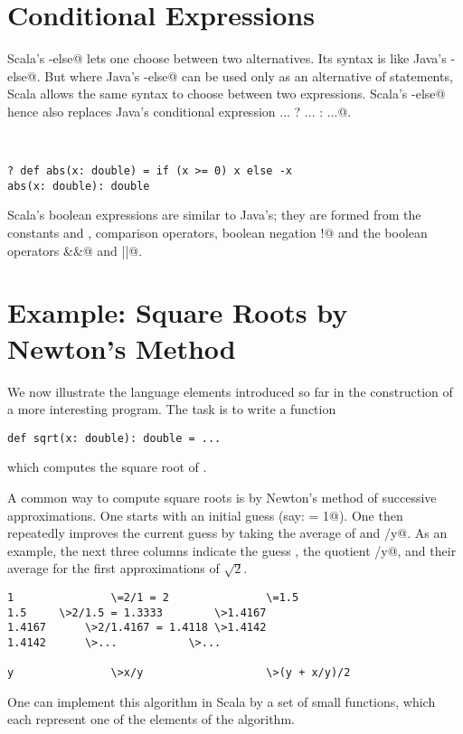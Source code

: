 \documentclass[11pt]{book}
\begin{document}
\section{Conditional Expressions}

Scala's \verb@if-else@ lets one choose between two alternatives.  Its
syntax is like Java's \verb@if-else@. But where Java's \verb@if-else@
can be used only as an alternative of statements, Scala allows the
same syntax to choose between two expressions. Scala's \verb@if-else@
hence also replaces Java's conditional expression \verb@ ... ? ... :
...@.

\example\ 

\begin{verbatim}
? def abs(x: double) = if (x >= 0) x else -x
abs(x: double): double
\end{verbatim}
Scala's boolean expressions are similar to Java's; they are formed
from the constants
\verb@true@ and
\verb@false@, comparison operators, boolean negation \verb@!@ and the
boolean operators \verb@&&@ and \verb@||@.

\section{\label{sec:sqrt}Example: Square Roots by Newton's Method}

We now illustrate the language elements introduced so far in the
construction of a more interesting program. The task is to write a
function
\begin{verbatim}
def sqrt(x: double): double = ... 
\end{verbatim}
which computes the square root of \verb@x@.

A common way to compute square roots is by Newton's method of
successive approximations. One starts with an initial guess \verb@y@
(say: \verb@y = 1@). One then repeatedly improves the current guess
\verb@y@ by taking the average of \verb@y@ and \verb@x/y@.
As an example, the next three columns indicate the guess \verb@y@, the
quotient \verb@x/y@, and their average for the first approximations of
$\sqrt 2$. 
\begin{verbatim}
1               \=2/1 = 2               \=1.5
1.5		\>2/1.5 = 1.3333        \>1.4167
1.4167		\>2/1.4167 = 1.4118	\>1.4142
1.4142		\>...			\>...

y               \>x/y                   \>(y + x/y)/2
\end{verbatim}
One can implement this algorithm in Scala by a set of small functions,
which each represent one of the elements of the algorithm.  
\end{document}
